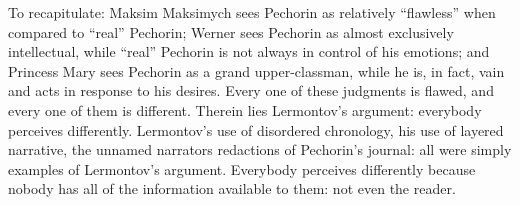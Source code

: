 \documentclass[a4paper,12pt]{article}
\begin{document}

    To recapitulate: Maksim Maksimych sees Pechorin as relatively ``flawless'' when compared to
    ``real'' Pechorin; Werner sees Pechorin as almost exclusively intellectual, while ``real''
    Pechorin is not always in control of his emotions; and Princess Mary sees Pechorin as a
    grand upper-classman, while he is, in fact, vain and acts in response to his desires.
    Every one of these judgments is flawed, and every one of them is different. Therein lies
    Lermontov's argument: everybody perceives differently. Lermontov's use of disordered
    chronology, his use of layered narrative, the unnamed narrators redactions of Pechorin's
    journal: all were simply examples of Lermontov's argument. Everybody perceives differently
    because nobody has all of the information available to them: not even the reader.


    \newpage
    \printbibliography
\end{document}
